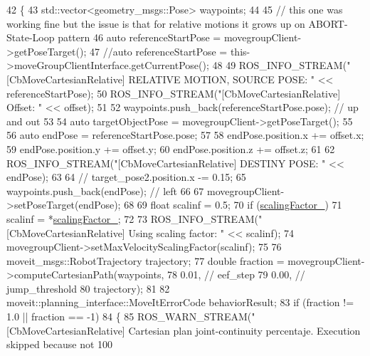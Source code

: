 \begin{DoxyCode}
42 \{
43   std::vector<geometry\_msgs::Pose> waypoints;
44 
45   \textcolor{comment}{// this one was working fine but the issue is that for relative motions it grows up on ABORT-State-Loop
       pattern}
46   \textcolor{keyword}{auto} referenceStartPose = movegroupClient->getPoseTarget(); 
47   \textcolor{comment}{//auto referenceStartPose = this->moveGroupClientInterface.getCurrentPose();}
48 
49   ROS\_INFO\_STREAM(\textcolor{stringliteral}{"[CbMoveCartesianRelative] RELATIVE MOTION, SOURCE POSE: "} << referenceStartPose);
50   ROS\_INFO\_STREAM(\textcolor{stringliteral}{"[CbMoveCartesianRelative] Offset: "} << offset);
51 
52   waypoints.push\_back(referenceStartPose.pose);  \textcolor{comment}{// up and out}
53 
54   \textcolor{keyword}{auto} targetObjectPose = movegroupClient->getPoseTarget();
55 
56   \textcolor{keyword}{auto} endPose = referenceStartPose.pose;
57 
58   endPose.position.x += offset.x;
59   endPose.position.y += offset.y;
60   endPose.position.z += offset.z;
61 
62   ROS\_INFO\_STREAM(\textcolor{stringliteral}{"[CbMoveCartesianRelative] DESTINY POSE: "} << endPose);
63 
64   \textcolor{comment}{// target\_pose2.position.x -= 0.15;}
65   waypoints.push\_back(endPose);  \textcolor{comment}{// left}
66 
67   movegroupClient->setPoseTarget(endPose);
68 
69   \textcolor{keywordtype}{float} scalinf = 0.5;
70   \textcolor{keywordflow}{if} (\hyperlink{classcl__move__group__interface_1_1CbMoveCartesianRelative_a2b5e5f05bce94dd3078abfd306c6ef39}{scalingFactor\_})
71     scalinf = *\hyperlink{classcl__move__group__interface_1_1CbMoveCartesianRelative_a2b5e5f05bce94dd3078abfd306c6ef39}{scalingFactor\_};
72 
73   ROS\_INFO\_STREAM(\textcolor{stringliteral}{"[CbMoveCartesianRelative] Using scaling factor: "} << scalinf);
74   movegroupClient->setMaxVelocityScalingFactor(scalinf);
75 
76   moveit\_msgs::RobotTrajectory trajectory;
77   \textcolor{keywordtype}{double} fraction = movegroupClient->computeCartesianPath(waypoints,
78                                                           0.01,  \textcolor{comment}{// eef\_step}
79                                                           0.00,  \textcolor{comment}{// jump\_threshold}
80                                                           trajectory);
81 
82   moveit::planning\_interface::MoveItErrorCode behaviorResult;
83   \textcolor{keywordflow}{if} (fraction != 1.0 || fraction == -1)
84   \{
85     ROS\_WARN\_STREAM(\textcolor{stringliteral}{"[CbMoveCartesianRelative] Cartesian plan joint-continuity percentaje. Execution
       skipped because not 100%
}
\end{DoxyCode}
